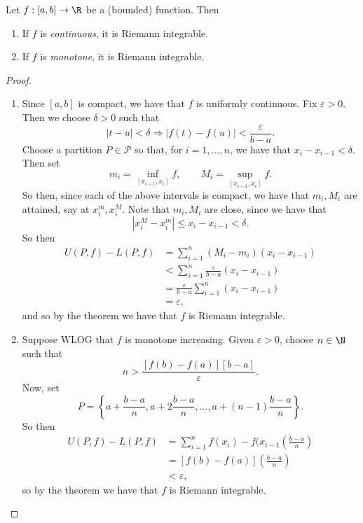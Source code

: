 \documentclass{notes}
\begin{document}
\begin{theorem}
  Let $f: [a,b] \to \R$ be a (bounded) function. Then 
  \begin{enumerate}
    \item If $f$ is \emph{continuous}, it is Riemann integrable. 
    \item If $f$ is \emph{monotone}, it is Riemann integrable.
  \end{enumerate}
\end{theorem}
\begin{proof}\leavevmode
 \begin{enumerate}
   \item Since $[a,b]$ is compact, we have that $f$ is uniformly continuous. Fix $\varepsilon > 0$.
     Then we choose $\delta > 0$ such that $$|t - u| < \delta \Rightarrow |f(t) - f(u)| <
     \frac{\varepsilon}{b-a}.$$ Choose a partition $P\in\mathcal{P}$ so that, for $i=1, \ldots, n$,
     we have that $x_i - x_{i-1} < \delta.$ Then set $$m_i = \inf_{[x_{i-1}, x_i]}f, \qquad M_i =
     \sup_{[x_{i-1}, x_i]}f.$$ So then, since each of the above intervals is compact, we have that
     $m_i, M_i$ are attained, say at $x_i^m, x_i^M$. Note that $m_i, M_i$ are close, since we have
     that $$|x_i^M - x_i^m| \leq x_i - x_{i-1} < \delta.$$ So then 
     \begin{align*}
       U(P, f) - L(P, f) &= \sum_{i=1}^n (M_i - m_i)(x_i - x_{i-1}) \\
                         &< \sum_{i=1}^n \frac{\varepsilon}{b-a}(x_i - x_{i-1}) \\
                         &= \frac{\varepsilon}{b-a} \sum_{i=1}^n (x_i - x_{i-1}) \\
                         &= \varepsilon,
     \end{align*}
     and so by the theorem we have that $f$ is Riemann integrable.

  \item Suppose WLOG that $f$ is monotone increasing. Given $\varepsilon > 0$, choose $n\in\N$ such
    that $$n > \frac{[f(b) - f(a)][b-a]}{\varepsilon}.$$ Now, set 
    $$P = \left\{ a + \frac{b-a}{n}, a + 2\frac{b-a}{n}, \ldots, a + (n-1)\frac{b-a}{n} \right\}.$$ 
    So then 
    \begin{align*}
      U(P, f) - L(P, f) &= \sum_{i=1}^n f(x_i) - f(x_{i-1} \left( \frac{b-a}{n} \right) \\
                        &= [f(b) - f(a)] \left( \frac{b-a}{n} \right) \\
                        &< \varepsilon,
    \end{align*}
    so by the theorem we have that $f$ is Riemann integrable.
 \end{enumerate} 
\end{proof}
\end{document}
